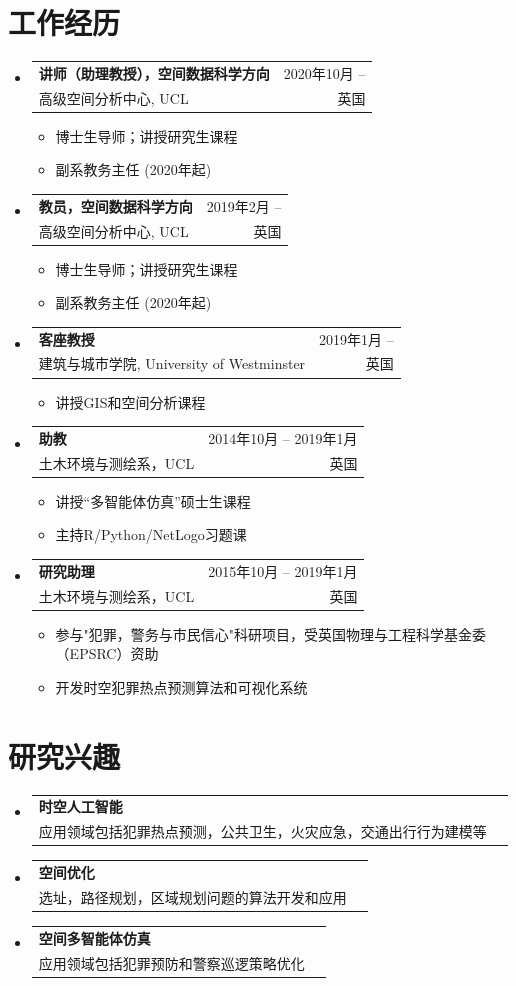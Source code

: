 \documentclass[A4,11pt]{article}
\makeatletter
\newcommand{\CVItem}[1]{
  \item\small{
    {#1 \vspace{-2pt}}
  }
}
\newcommand{\CVSubheading}[4]{
  \vspace{-2pt}\item
    \begin{tabular*}{0.97\textwidth}[t]{l@{\extracolsep{\fill}}r}
      \textbf{#1} & #2 \\
      \small#3 & \small #4 \\
    \end{tabular*}\vspace{-7pt}
}
\newcommand{\CVSubHeadingListStart}{\begin{itemize}[leftmargin=0.5cm, label={}]}
\newcommand{\CVSubHeadingListEnd}{\end{itemize}}
\newcommand{\CVItemListStart}{\begin{itemize}}
\newcommand{\CVItemListEnd}{\end{itemize}\vspace{-5pt}}
\makeatother
\begin{document}
\begin{CJK*}{UTF8}{gbsn}

\section{工作经历}
  \CVSubHeadingListStart
    \CVSubheading
      {\textbf{讲师（助理教授）}，空间数据科学方向}{2020年10月 --}
      {高级空间分析中心, UCL}{英国}
      \CVItemListStart
        \CVItem{博士生导师；讲授研究生课程}        
        \CVItem{副系教务主任 (2020年起)}
      \CVItemListEnd
    \CVSubheading
    {教员，空间数据科学方向}{2019年2月 --}
      {高级空间分析中心, UCL}{英国}
      \CVItemListStart
        \CVItem{博士生导师；讲授研究生课程}        
        \CVItem{副系教务主任 (2020年起)}
      \CVItemListEnd
    \CVSubheading
      {客座教授}{2019年1月 --}
      {建筑与城市学院, University of Westminster}{英国}
      \CVItemListStart
        \CVItem{讲授GIS和空间分析课程}
    \CVItemListEnd
    \CVSubheading
      {助教}{2014年10月 -- 2019年1月}
      {土木环境与测绘系，UCL}{英国}
      \CVItemListStart
        \CVItem{讲授“多智能体仿真”硕士生课程}
        \CVItem{主持R/Python/NetLogo习题课}
      \CVItemListEnd
     \CVSubheading
      {研究助理}{2015年10月 -- 2019年1月}
      {土木环境与测绘系，UCL}{英国}
      \CVItemListStart
        \CVItem{参与"犯罪，警务与市民信心"科研项目，受英国物理与工程科学基金委（EPSRC）资助}
        \CVItem{开发时空犯罪热点预测算法和可视化系统}
      \CVItemListEnd
  \CVSubHeadingListEnd

\section{研究兴趣}
  \CVSubHeadingListStart
    \CVSubheading
      {时空人工智能}{}
      {应用领域包括犯罪热点预测，公共卫生，火灾应急，交通出行行为建模等}{}
    \CVSubheading
      {空间优化}{}
      {选址，路径规划，区域规划问题的算法开发和应用}{}
    \CVSubheading
      {空间多智能体仿真}{}
      {应用领域包括犯罪预防和警察巡逻策略优化}{}
  \CVSubHeadingListEnd


\end{CJK*}
\end{document}
